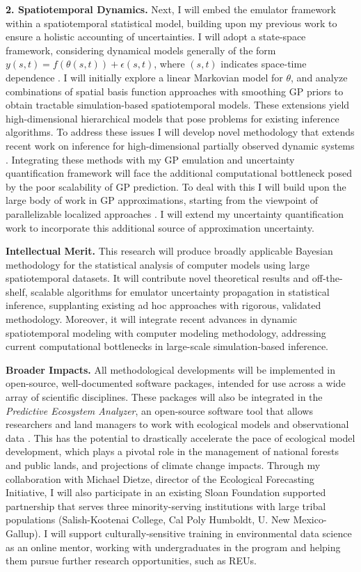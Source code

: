 \documentclass[11pt]{article}
\begin{document}
 \textbf{2. Spatiotemporal Dynamics.} Next, I will embed the emulator framework within a spatiotemporal statistical model, building upon my previous work to ensure a holistic accounting of uncertainties. I will adopt a state-space framework, considering dynamical models generally of the form $y(s, t) = f(\theta(s, t)) + \epsilon(s, t)$, where $(s, t)$ indicates space-time dependence \cite{Wikle, Hefley}. I will initially explore a linear Markovian model for $\theta$, and analyze combinations of spatial basis function approaches with smoothing GP priors to obtain tractable simulation-based spatiotemporal models. 
These extensions yield high-dimensional hierarchical models that pose problems for existing inference algorithms. To address these issues I will develop novel methodology that extends recent work on inference for high-dimensional partially observed dynamic systems \cite{Park}. Integrating these methods with my GP emulation and uncertainty quantification framework will face the additional computational bottleneck posed by the poor scalability of GP prediction. To deal with this I will build upon the large body of work in GP approximations, starting from the viewpoint of parallelizable localized approaches \cite{Gramacy}. I will extend my uncertainty quantification work to incorporate this additional source of approximation uncertainty. 

\noindent
\textbf{Intellectual Merit.} This research will produce broadly applicable Bayesian methodology for the statistical analysis of computer models using large spatiotemporal datasets. It will contribute novel theoretical results and off-the-shelf, scalable algorithms for emulator uncertainty propagation in statistical inference, supplanting existing ad hoc approaches with rigorous, validated methodology. Moreover, it will integrate recent advances in dynamic spatiotemporal modeling with computer modeling methodology, addressing current computational bottlenecks in large-scale simulation-based inference.

\noindent
\textbf{Broader Impacts.} All methodological developments will be implemented in open-source, well-documented software packages, intended for use across a wide array of scientific disciplines. These packages will also be integrated in the \textit{Predictive Ecosystem Analyzer}, an open-source software tool that allows researchers and land managers to work with ecological models and observational data \cite{Fer}. This has the potential to drastically accelerate the pace of ecological model development, which plays a pivotal role in the management of national forests and public lands, and projections of climate change impacts. Through my collaboration with Michael Dietze, director of the Ecological Forecasting Initiative, I will also participate in an existing Sloan Foundation supported partnership that serves three minority-serving institutions with large tribal populations (Salish-Kootenai College, Cal Poly Humboldt, U. New Mexico-Gallup). I will support culturally-sensitive training in environmental data science as an online mentor, working with undergraduates in the program and helping them pursue further research opportunities, such as REUs. 
\end{document}
